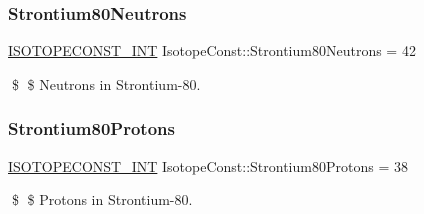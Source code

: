\subsubsection{\texorpdfstring{Strontium80\+Neutrons}{Strontium80Neutrons}}
{\footnotesize\ttfamily \mbox{\hyperlink{group___isotope_const-_macros_ga5f18360b3e99483a35c32d789e62621c}{I\+S\+O\+T\+O\+P\+E\+C\+O\+N\+S\+T\+\_\+\+I\+NT}} Isotope\+Const\+::\+Strontium80\+Neutrons = 42}

\$ \$ Neutrons in Strontium-\/80. \mbox{\label{group___isotope_const-_strontium-_sr80_gafbab7693491cfd91975edc6b22b339ba}} 
\subsubsection{\texorpdfstring{Strontium80\+Protons}{Strontium80Protons}}
{\footnotesize\ttfamily \mbox{\hyperlink{group___isotope_const-_macros_ga5f18360b3e99483a35c32d789e62621c}{I\+S\+O\+T\+O\+P\+E\+C\+O\+N\+S\+T\+\_\+\+I\+NT}} Isotope\+Const\+::\+Strontium80\+Protons = 38}

\$ \$ Protons in Strontium-\/80. 